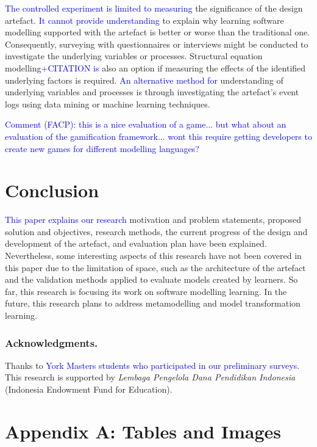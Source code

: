 \documentclass[runningheads,a4paper]{llncs}
\begin{document}
\textcolor{blue}{The controlled experiment is limited  to measuring} the significance of the design artefact\textcolor{blue}{.  It cannot provide understanding }to explain why learning software modelling supported with the artefact is better or worse than the traditional one. Consequently, surveying with questionnaires or interviews might be conducted to investigate the underlying variables or processes. Structural equation modelling\textcolor{blue}{+CITATION is} also an option if measuring the effects of the identified underlying factors is required.  \textcolor{blue}{An alternative method for} understanding of underlying variables and processes is through investigating the artefact's event logs using data mining or machine learning techniques.


\textcolor{blue}{Comment (FACP): this is a nice evaluation of a game... but what about an evaluation of the gamification framework... wont this require getting developers to create new games for different modelling languages?}

\section{Conclusion}
\textcolor{blue}{This paper explains our research} motivation and problem statements, proposed solution and objectives, research methods, the current progress of the design and development of the artefact, and evaluation plan have been explained. Nevertheless, some interesting aspects of this research have not been covered in this paper due to the limitation of space, such as the architecture of the artefact and the validation methods applied to evaluate models created by learners. So far, this research is focusing its work on software modelling learning. In the future, this research plans to address metamodelling and model transformation learning. 

\subsubsection*{Acknowledgments.} Thanks to \textcolor{blue}{York Masters students who  participated in our preliminary surveys}. This research is supported by \emph{Lembaga Pengelola Dana Pendidikan Indonesia} (Indonesia Endowment Fund for Education). 

 


\clearpage
\section{Appendix A: Tables and Images}
\end{document}
